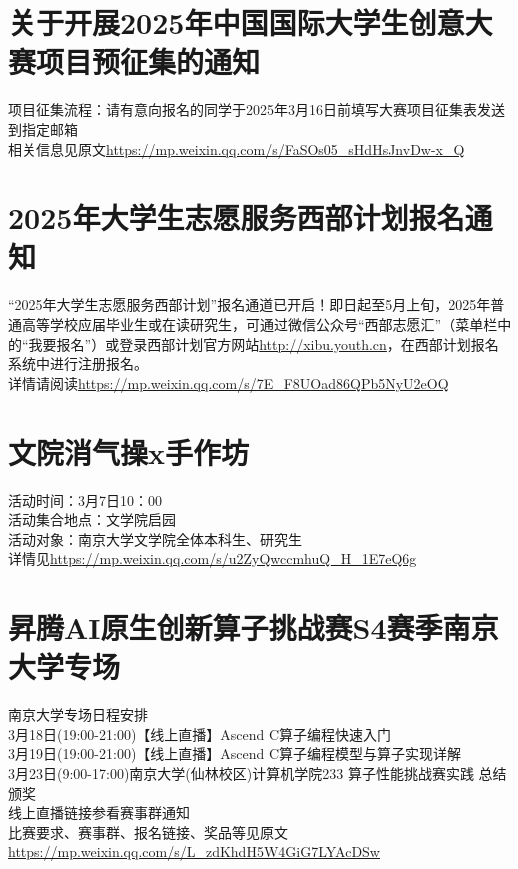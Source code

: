 \documentclass[letterpaper, 12pt]{article}
\begin{document}
\begin{multicols}{2}
\section{关于开展2025年中国国际大学生创意大赛项目预征集的通知}
项目征集流程：请有意向报名的同学于2025年3月16日前填写大赛项目征集表发送到指定邮箱\\
相关信息见原文\url{https://mp.weixin.qq.com/s/FaSOs05_sHdHsJnvDw-x_Q}\\

\section{2025年大学生志愿服务西部计划报名通知}
“2025年大学生志愿服务西部计划”报名通道已开启！即日起至5月上旬，2025年普通高等学校应届毕业生或在读研究生，可通过微信公众号“西部志愿汇”（菜单栏中的“我要报名”）或登录西部计划官方网站\url{http://xibu.youth.cn}，在西部计划报名系统中进行注册报名。\\
详情请阅读\url{https://mp.weixin.qq.com/s/7E_F8UOad86QPb5NyU2eOQ}\\


\section{文院消气操x手作坊}
活动时间：3月7日10：00\\
活动集合地点：文学院启园\\
活动对象：南京大学文学院全体本科生、研究生\\
详情见\url{https://mp.weixin.qq.com/s/u2ZyQwccmhuQ_H_1E7eQ6g}\\

\section{昇腾AI原生创新算子挑战赛S4赛季南京大学专场}
南京大学专场日程安排\\
3月18日(19:00-21:00)【线上直播】Ascend C算子编程快速入门\\
3月19日(19:00-21:00)【线上直播】Ascend C算子编程模型与算子实现详解\\
3月23日(9:00-17:00)南京大学(仙林校区)计算机学院233 算子性能挑战赛实践 总结颁奖\\
线上直播链接参看赛事群通知\\
比赛要求、赛事群、报名链接、奖品等见原文\url{https://mp.weixin.qq.com/s/L_zdKhdH5W4GiG7LYAcDSw}\\



\end{multicols} 
\end{document}
